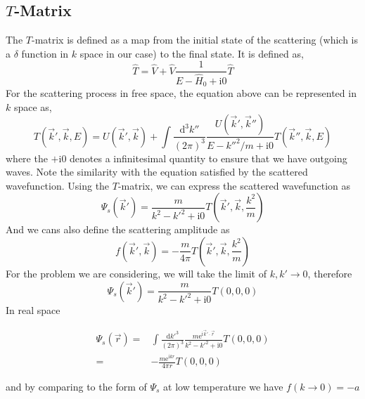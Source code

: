 \documentclass[aps,twocolumn,secnumarabic,balancelastpage,amsmath,amssymb,nofootinbib]{revtex4}
\newcommand{\ud}{\mathrm{d}}
\newcommand{\ue}{\mathrm{e}}
\newcommand{\ui}{\mathrm{i}}
\newcommand{\eqar}[1]
{
  \begin{align*}
    #1
  \end{align*}
}
\newcommand{\paren}[1]{{\left({#1}\right)}}
\begin{document}
\subsection{$T$-Matrix}
The $T$-matrix is defined as a map from the initial state of the scattering (which is a $\delta$ function in $k$ space in our case) to the final state. It is defined as,
\[\hat T=\hat V+\hat V\frac{1}{E-\hat H_0+\ui 0}\hat T\]
For the scattering process in free space, the equation above can be represented in $k$ space as,
\[T\paren{\vec k', \vec k, E}=U\paren{\vec k', \vec k}+\int\frac{\ud^3k''}{\paren{2\pi}^3}\frac{U\paren{\vec k', \vec k''}}{E-k''^2/m+\ui 0}T\paren{\vec k'', \vec k, E}\]
where the $+\ui 0$ denotes a infinitesimal quantity to ensure that we have outgoing waves. Note the similarity with the equation satisfied by the scattered wavefunction. Using the $T$-matrix, we can express the scattered wavefunction as
\[\Psi_s\paren{\vec k'}=\frac{m}{k^2-k'^2+\ui 0}T\paren{\vec k', \vec k, \frac{k^2}m}\]
And we cans also define the scattering amplitude as
\[f\paren{\vec k', \vec k}=-\frac{m}{4\pi}T\paren{\vec k', \vec k, \frac{k^2}{m}}\]
For the problem we are considering, we will take the limit of $k, k'\rightarrow0$, therefore
\[\Psi_s\paren{\vec k'}=\frac{m}{k^2-k'^2+\ui 0}T\paren{0, 0, 0}\]
In real space
\eqar{
  \Psi_s\paren{\vec r}=&\int\frac{\ud k'^3}{\paren{2\pi}^3}\frac{m\ue^{\ui\vec k'\cdot\vec r}}{k^2-k'^2+\ui 0}T\paren{0, 0, 0}\\
  =&-\frac{m\ue^{\ui kr}}{4\pi r}T\paren{0, 0, 0}
}
and by comparing to the form of $\Psi_s$ at low temperature we have $f(k\rightarrow0)=-a$
\end{document}
